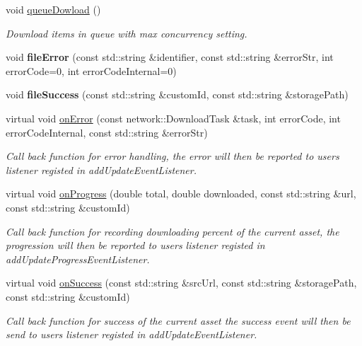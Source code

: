 \begin{DoxyCompactItemize}
\mbox{\label{classAssetsManagerEx_a7783f55f4ca3153a3ca75af86a8ab2a4}} 
void \hyperlink{classAssetsManagerEx_a7783f55f4ca3153a3ca75af86a8ab2a4}{queue\+Dowload} ()
\begin{DoxyCompactList}\small\item\em Download items in queue with max concurrency setting. \end{DoxyCompactList}\item 
\mbox{\label{classAssetsManagerEx_aa207fb46ec759ace7af6eb16287e6264}} 
void {\bfseries file\+Error} (const std\+::string \&identifier, const std\+::string \&error\+Str, int error\+Code=0, int error\+Code\+Internal=0)
\item 
\mbox{\label{classAssetsManagerEx_ac5acab0a62b3fc6d8618684e41da8b43}} 
void {\bfseries file\+Success} (const std\+::string \&custom\+Id, const std\+::string \&storage\+Path)
\item 
virtual void \hyperlink{classAssetsManagerEx_a95466efda302ece8afeaea7853699728}{on\+Error} (const network\+::\+Download\+Task \&task, int error\+Code, int error\+Code\+Internal, const std\+::string \&error\+Str)
\begin{DoxyCompactList}\small\item\em Call back function for error handling, the error will then be reported to user\textquotesingle{}s listener registed in add\+Update\+Event\+Listener. \end{DoxyCompactList}\item 
virtual void \hyperlink{classAssetsManagerEx_a3b5fb48fca79802cd0d6439eb0746e95}{on\+Progress} (double total, double downloaded, const std\+::string \&url, const std\+::string \&custom\+Id)
\begin{DoxyCompactList}\small\item\em Call back function for recording downloading percent of the current asset, the progression will then be reported to user\textquotesingle{}s listener registed in add\+Update\+Progress\+Event\+Listener. \end{DoxyCompactList}\item 
virtual void \hyperlink{classAssetsManagerEx_a4f3b1952b52e4700f65a38e4d4a66b90}{on\+Success} (const std\+::string \&src\+Url, const std\+::string \&storage\+Path, const std\+::string \&custom\+Id)
\begin{DoxyCompactList}\small\item\em Call back function for success of the current asset the success event will then be send to user\textquotesingle{}s listener registed in add\+Update\+Event\+Listener. \end{DoxyCompactList}\end{DoxyCompactItemize}
